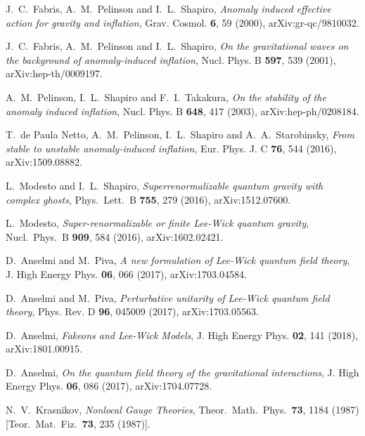 \documentclass[aps,prd,a4paper,twocolumn,showpacs,showkeys,preprintnumbers,amsmath,amssymb,nofootinbib,usenames,dvipsnames]{revtex4-2}
\begin{document}
\begin{thebibliography}{99}
J.~C.~Fabris, A.~M.~Pelinson and I.~L.~Shapiro,
{\it Anomaly induced effective action for gravity and inflation},
Grav. Cosmol. \textbf{6}, 59 (2000), 
arXiv:gr-qc/9810032.

J.~C.~Fabris, A.~M.~Pelinson and I.~L.~Shapiro,
{\it On the gravitational waves on the background of anomaly-induced inflation},
Nucl. Phys. B \textbf{597}, 539 (2001), 
arXiv:hep-th/0009197.

A.~M.~Pelinson, I.~L.~Shapiro and F.~I.~Takakura,
{\it On the stability of the anomaly induced inflation},
Nucl. Phys. B \textbf{648}, 417 (2003),
arXiv:hep-ph/0208184.

T.~de Paula Netto, A.~M.~Pelinson, I.~L.~Shapiro and A.~A.~Starobinsky,
{\it From stable to unstable anomaly-induced inflation},
Eur. Phys. J. C \textbf{76}, 544 (2016),
arXiv:1509.08882.


L.~Modesto and I.~L.~Shapiro,
{\it Superrenormalizable quantum gravity with complex ghosts},
Phys.\ Lett.\ B {\bf 755}, 279 (2016), arXiv:1512.07600.

L.~Modesto,
{\it Super-renormalizable or finite Lee-Wick quantum gravity},
Nucl.\ Phys.\ B {\bf 909}, 584 (2016), arXiv:1602.02421.

D.~Anselmi and M.~Piva,
{\it A new formulation of Lee-Wick quantum field theory},
J. High Energy Phys. \textbf{06}, 066 (2017),
arXiv:1703.04584.

D.~Anselmi and M.~Piva,
{\it Perturbative unitarity of Lee-Wick quantum field theory},
Phys. Rev. D \textbf{96}, 045009 (2017),
arXiv:1703.05563.

D.~Anselmi,
{\it Fakeons and Lee-Wick Models},
J. High Energy Phys. \textbf{02}, 141 (2018),
arXiv:1801.00915.

D.~Anselmi,
{\it On the quantum field theory of the gravitational interactions},
J. High Energy Phys.  \textbf{06}, 086 (2017),
arXiv:1704.07728.

  N.~V.~Krasnikov,
  {\it Nonlocal Gauge Theories},
  Theor.\ Math.\ Phys.\  {\bf 73}, 1184 (1987)
  [Teor.\ Mat.\ Fiz.\  {\bf 73}, 235 (1987)].


\end{thebibliography}
\end{document}
